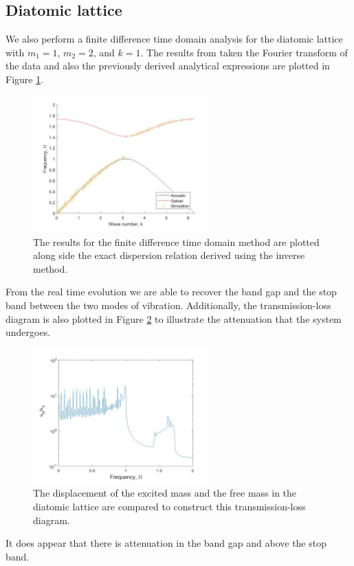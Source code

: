 \documentclass{article}
\begin{document}
\subsection{Diatomic lattice}
We also perform a finite difference time domain analysis for the diatomic 
lattice with $m_1=1$, $m_2=2$, and $k=1$. The results from taken the Fourier 
transform of the data and also the previously derived analytical expressions 
are plotted in Figure \ref{fig:diadr}.
\begin{figure}[!htbp]
	\centering
	\includegraphics[width=0.6\textwidth]{diatomic-dr.pdf}
	\caption{The results for the finite difference time domain method are 
	plotted along side the exact dispersion relation derived using the inverse 
	method.}
	\label{fig:diadr}
\end{figure}
From the real time evolution we are able to recover the band gap and the stop 
band between the two modes of vibration. Additionally, the transmission-loss 
diagram is also plotted in Figure \ref{fig:tlds} to illustrate the attenuation 
that the system undergoes.
\begin{figure}[!htbp]
	\centering
	\includegraphics[width=0.6\textwidth]{dia-tl-diag.pdf}
	\caption{The displacement of the excited mass and the free mass in the 
	diatomic lattice are compared to construct this transmission-loss diagram.}
	\label{fig:tlds}
\end{figure}
It does appear that there is attenuation in the band gap and above the stop 
band. 
\end{document}
